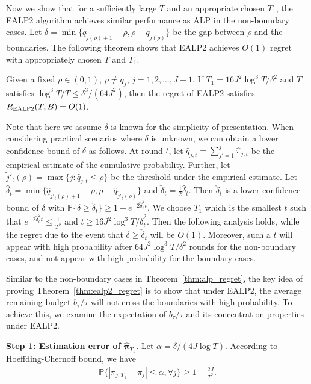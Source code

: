 Now we show that for a sufficiently large $T$ and an appropriate chosen $T_1$, the EALP2 algorithm achieves similar performance as ALP in the non-boundary cases. Let $\delta = \min\{q_{\tilde{j}(\rho) + 1} - \rho, \rho - q_{\tilde{j}(\rho)}\}$ be the gap between $\rho$ and the boundaries. The following theorem shows that EALP2 achieves $O(1)$ regret with appropriately chosen $T$ and $T_1$.
\begin{theorem} \label{thm:ealp2_regret}
Given a fixed $\rho \in (0,1)$, $\rho \neq q_j$, $j = 1,2,\ldots, J-1$. If $T_1 = 16 J^2\log^3 T/\delta^2$ and $T$ satisfies $\log^3 T/T \leq \delta^3/(64J^2)$, then the regret of EALP2 satisfies $R_{\rm EALP2}(T,B) = O(1)$.
\end{theorem}

Note that here we assume $\delta$ is known for the simplicity of presentation. When considering practical scenarios where $\delta$ is unknown, we can obtain a lower confidence bound of $\delta$ as follows. At round $t$, let $\hat{q}_{j,t} = \sum_{j'=1}^j \hat{\pi}_{j,t}$ be the empirical estimate of the cumulative probability. Further, let $\tilde{j}'_t(\rho) = \max \{j: \hat{q}_{j,t} \leq \rho\}$ be the threshold under the empirical estimate. Let $\hat{\delta}_{t} = \min\{\hat{q}_{\tilde{j}'_t(\rho) + 1} - \rho, \rho - \hat{q}_{\tilde{j}'_t(\rho)}\}$ and $\check{\delta}_{t} = \frac{1}{2}\hat{\delta}_{t}$. Then $\check{\delta}_{t}$ is a lower confidence bound of $\delta$ with $\mathbb{P}\{\delta \geq  \check{\delta}_{t}\} \geq 1 - e^{-2 \check{\delta}_{t}^2 t}$. We choose $T_1$ which is the smallest $t$ such that $e^{-2 \check{\delta}_{t}^2 t} \leq \frac{1}{T^2}$ and $t \geq 16 J^2\log^3 T/\check{\delta}_{t}^2$. Then the following analysis holds, while the regret due to the event that $\delta \geq  \check{\delta}_{t}$ will be $O(1)$. Moreover, such a $t$ will appear with high probability after $64 J^2\log^3 T/\delta^2$ rounds for the non-boundary cases, and not appear with high probability for the boundary cases.

Similar to the non-boundary cases in Theorem~\ref{thm:alp_regret}, the key idea of proving Theorem~\ref{thm:ealp2_regret} is to show that under EALP2, the average remaining budget $b_\tau/\tau$ will not cross the boundaries with high probability. To achieve this, we examine the expectation of $b_\tau/\tau$ and its concentration properties under EALP2.

\textbf{Step 1: Estimation error of $\hat{\boldsymbol{\pi}}_{T_1}$.} Let $\alpha = \delta/(4J\log T)$. According to Hoeffding-Chernoff bound, we have
\begin{eqnarray}
\mathbb{P}\{|\hat{\pi}_{j,T_1} - {\pi}_j| \leq \alpha, \forall j\} \geq 1 - \frac{2J}{T^2}.
\end{eqnarray}


